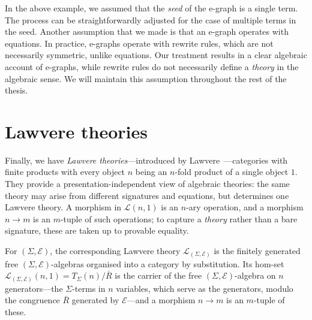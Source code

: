 \begin{remark}
  In the above example, we assumed that the \emph{seed} of the e-graph is a single term.
  The process can be straightforwardly adjusted for the case of multiple terms in the seed.
  Another assumption that we made is that an e-graph operates with equations.
  In practice, e-graphs operate with rewrite rules, which are not necessarily symmetric, unlike equations.
  Our treatment results in a clear algebraic account of e-graphs, while rewrite rules do not necessarily define a \emph{theory} in the algebraic sense.
  We will maintain this assumption throughout the rest of the thesis.
\end{remark}

\section{Lawvere theories}
Finally, we have \emph{Lawvere theories}---introduced by
Lawvere~\cite{LawvereFunctorialSemanticsAlgebraic1963}---categories with
finite products with every object $n$ being an $n$-fold product of a single object $1$. 
They provide a
presentation-independent view of algebraic theories: the same theory may
arise from different signatures and equations, but determines one Lawvere
theory. A morphism in $\mathcal{L}(n,1)$ is an $n$-ary operation, and a
morphism $n \to m$ is an $m$-tuple of such operations; to capture a
\emph{theory} rather than a bare signature, these are taken up to
provable equality.

For $(\Sigma, \mathcal{E})$, the corresponding Lawvere theory
$\mathcal{L}_{(\Sigma,\mathcal{E})}$ is the finitely generated free
$(\Sigma,\mathcal{E})$-algebras organised into a category by
substitution. 
Its hom-set $\mathcal{L}_{(\Sigma,\mathcal{E})}(n,1) =
T_\Sigma(n)/\bar R$ is the carrier of the free
$(\Sigma,\mathcal{E})$-algebra on $n$ generators---the $\Sigma$-terms in
$n$ variables, which serve as the generators, modulo the congruence
$\bar R$ generated by $\mathcal{E}$---and a morphism $n \to m$ is an
$m$-tuple of these.


